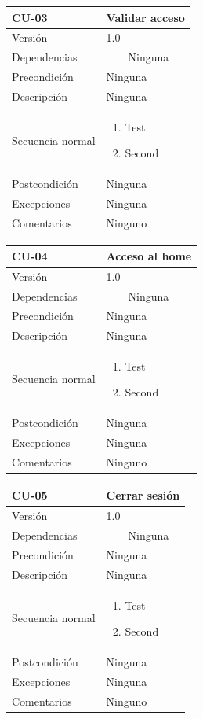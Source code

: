 \documentclass[12pt, a4paper, twoside]{article}
\newcommand{\tabitem}{~~\llap{\textbullet}~~}
\begin{document}
\begin{longtable}{ |l|l| }
  \hline
  CU-03 & Validar acceso \\ \hline
  Versión & 1.0 \\ \hline
  Dependencias & 
    \tabitem Ninguna \\ \hline
  Precondición & Ninguna \\ \hline
  Descripción & Ninguna \\ \hline
  Secuencia normal & 
  \parbox{.45\textwidth}{
    \begin{enumerate}
      \item Test
      \item Second
    \end{enumerate}
  } \\ \hline
  Postcondición & Ninguna \\ \hline
  Excepciones & Ninguna \\ \hline
  Comentarios & Ninguno \\ \hline
\end{longtable}

\begin{longtable}{ |l|l| }
  \hline
  CU-04 & Acceso al home \\ \hline
  Versión & 1.0 \\ \hline
  Dependencias & 
    \tabitem Ninguna \\ \hline
  Precondición & Ninguna \\ \hline
  Descripción & Ninguna \\ \hline
  Secuencia normal & 
  \parbox{.45\textwidth}{
    \begin{enumerate}
      \item Test
      \item Second
    \end{enumerate}
  } \\ \hline
  Postcondición & Ninguna \\ \hline
  Excepciones & Ninguna \\ \hline
  Comentarios & Ninguno \\ \hline
\end{longtable}

\begin{longtable}{ |l|l| }
  \hline
  CU-05 & Cerrar sesión \\ \hline
  Versión & 1.0 \\ \hline
  Dependencias & 
    \tabitem Ninguna \\ \hline
  Precondición & Ninguna \\ \hline
  Descripción & Ninguna \\ \hline
  Secuencia normal & 
  \parbox{.45\textwidth}{
    \begin{enumerate}
      \item Test
      \item Second
    \end{enumerate}
  } \\ \hline
  Postcondición & Ninguna \\ \hline
  Excepciones & Ninguna \\ \hline
  Comentarios & Ninguno \\ \hline
\end{longtable}
\end{document}
